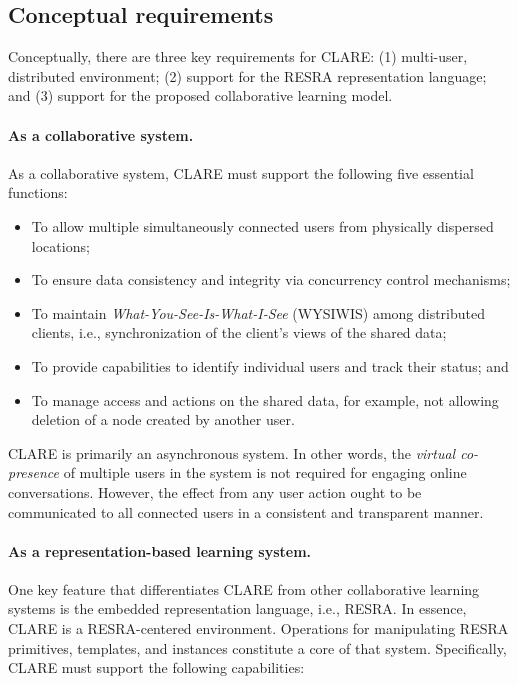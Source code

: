 \subsection{Conceptual requirements}
\label{sec:conceptual-requirement}

Conceptually, there are three key requirements for CLARE: (1) multi-user,
distributed environment; (2) support for the RESRA representation language;
and (3) support for the proposed collaborative learning model.

\paragraph{As a collaborative system.}

As a collaborative system, CLARE must support the following five essential
functions:

\begin{itemize}
\item To allow multiple simultaneously connected users from physically
  dispersed locations;
  
\item To ensure data consistency and integrity via concurrency control
  mechanisms;
  
\item To maintain {\it What-You-See-Is-What-I-See\/} (WYSIWIS) among
  distributed clients, i.e., synchronization of the client's views of the
  shared data;
  
\item To provide capabilities to identify individual users and track
  their status; and
  
\item To manage access and actions on the shared data, for example, not
  allowing deletion of a node created by another user.
\end{itemize}

CLARE is primarily an asynchronous system. In other words, the {\it virtual
co-presence\/} of multiple users in the system is not required for engaging
online conversations. However, the effect from any user action ought to be
communicated to all connected users in a consistent and transparent manner.


\paragraph{As a representation-based learning system.}

One key feature that differentiates CLARE from other collaborative learning
systems is the embedded representation language, i.e., RESRA. In essence,
CLARE is a RESRA-centered environment. Operations for manipulating RESRA
primitives, templates, and instances constitute a core of that system.
Specifically, CLARE must support the following capabilities:

